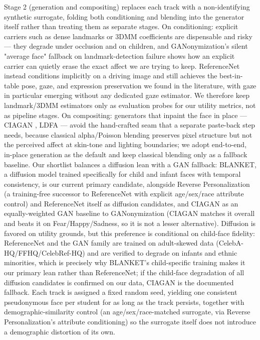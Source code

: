 \documentclass[12pt]{article}
\begin{document}
Stage 2 (generation and compositing) replaces each track with a non-identifying synthetic surrogate, folding both conditioning and blending into the generator itself rather than treating them as separate stages. On conditioning: explicit carriers such as dense landmarks or 3DMM coefficients are dispensable and risky — they degrade under occlusion and on children, and GANonymization's silent "average face" fallback on landmark-detection failure \cite{hellmann} shows how an explicit carrier can quietly erase the exact affect we are trying to keep. ReferenceNet \cite{kung} instead conditions implicitly on a driving image and still achieves the best-in-table pose, gaze, and expression preservation we found in the literature, with gaze in particular emerging without any dedicated gaze estimator. We therefore keep landmark/3DMM estimators only as evaluation probes for our utility metrics, not as pipeline stages. On compositing: generators that inpaint the face in place — CIAGAN \cite{ciagan}, LDFA \cite{klemp} — avoid the hand-crafted seam that a separate paste-back step needs, because classical alpha/Poisson blending preserves pixel structure but not the perceived affect at skin-tone and lighting boundaries; we adopt end-to-end, in-place generation as the default and keep classical blending only as a fallback baseline. Our shortlist balances a diffusion lean with a GAN fallback: BLANKET, a diffusion model trained specifically for child and infant faces with temporal consistency, is our current primary candidate, alongside Reverse Personalization (a training-free successor to ReferenceNet with explicit age/sex/race attribute control) and ReferenceNet itself as diffusion candidates, and CIAGAN as an equally-weighted GAN baseline to GANonymization \cite{hellmann} (CIAGAN matches it overall and beats it on Fear/Happy/Sadness, so it is not a lesser alternative). Diffusion is favored on utility grounds, but this preference is conditional on child-face fidelity: ReferenceNet and the GAN family are trained on adult-skewed data (CelebA-HQ/FFHQ/CelebRef-HQ) and are verified to degrade on infants and ethnic minorities, which is precisely why BLANKET's child-specific training makes it our primary lean rather than ReferenceNet; if the child-face degradation of all diffusion candidates is confirmed on our data, CIAGAN is the documented fallback. Each track is assigned a fixed random seed, yielding one consistent pseudonymous face per student for as long as the track persists, together with demographic-similarity control (an age/sex/race-matched surrogate, via Reverse Personalization's attribute conditioning) so the surrogate itself does not introduce a demographic distortion of its own.
\end{document}

